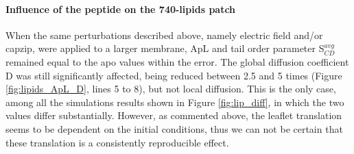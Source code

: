 \paragraph{Influence of the peptide on the 740-lipids patch} When the same perturbations described above, namely electric field and/or capzip, were applied to a larger membrane, ApL and tail order parameter S$^{avg}_{CD}$ remained equal to the apo values within the error. The global diffusion coefficient D was still significantly affected, being reduced between 2.5 and 5 times (Figure \ref{fig:lipids_ApL_D}, lines 5 to 8), but not local diffusion. This is the only case, among all the simulations results shown in Figure \ref{fig:lip_diff}, in which the two values differ substantially. However, as commented above, the leaflet translation seems to be dependent on the initial conditions, thus we can not be certain that these translation is a consistently reproducible effect.

